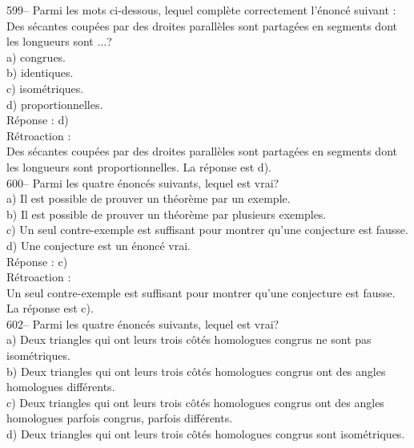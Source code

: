 ﻿\documentclass[letterpaper, 12pt]{article}
\begin{document}
599-- Parmi les mots ci-dessous, lequel compl\`ete correctement
l'\'enonc\'e suivant : \og Des s\'ecantes coup\'ees par des droites
parall\`eles sont partag\'ees en segments dont les longueurs sont $\ldots$\fg?\\
a) congrues.\\
b) identiques.\\
c) isom\'etriques.\\
d) proportionnelles.\\

R\'eponse : d)\\

R\'etroaction : \\
Des s\'ecantes coup\'ees par des droites parall\`eles sont partag\'ees en
segments dont les longueurs sont proportionnelles.  La r\'eponse est d).\\

600-- Parmi les quatre \'enonc\'es suivants, lequel est vrai?\\
a) Il est possible de prouver un th\'eor\`eme par un exemple.\\
b) Il est possible de prouver un th\'eor\`eme par plusieurs exemples.\\
c) Un seul contre-exemple est suffisant pour montrer qu'une conjecture est
fausse.\\
d) Une conjecture est un \'enonc\'e vrai.\\

R\'eponse : c)\\

R\'etroaction : \\
Un seul contre-exemple est suffisant pour montrer qu'une conjecture est
fausse.  La r\'eponse est c).\\



602-- Parmi les quatre \'enonc\'es suivants, lequel est vrai?\\
a) Deux triangles qui ont leurs trois c\^ot\'es homologues congrus ne sont
pas isom\'etriques.\\
b) Deux triangles qui ont leurs trois c\^ot\'es homologues congrus ont des
angles homologues diff\'erents.\\
c) Deux triangles qui ont leurs trois c\^ot\'es homologues congrus ont des
angles homologues parfois congrus, parfois diff\'erents.\\
d) Deux triangles qui ont leurs trois c\^ot\'es homologues congrus sont
isom\'etriques.\\
\end{document}
